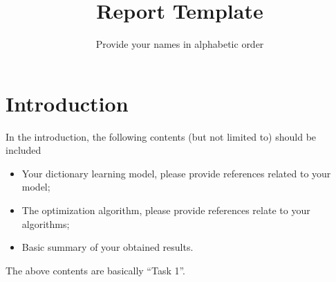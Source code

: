 \documentclass[a4paper,11pt]{article}
\title{\bf Report Template}
\author{Provide your names in alphabetic order}
\date{}
\begin{document}
\maketitle





\section{Introduction}

In the introduction, the following contents (but not limited to) should be included
\begin{itemize}
\item Your dictionary learning model, please provide references related to your model;
\item The optimization algorithm, please provide references relate to your algorithms;
\item Basic summary of your obtained results.
\end{itemize}

\begin{remark}
The above contents are basically ``Task 1''.
\end{remark}
\end{document}

